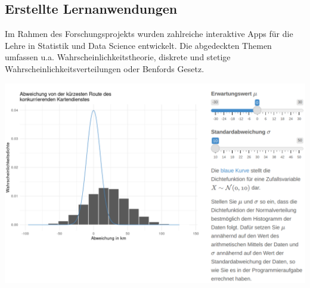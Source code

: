 \documentclass[a0,portrait]{a0poster}
\begin{document}
\begin{multicols}{2}


%
%

\section*{Erstellte Lernanwendungen}

Im Rahmen des Forschungsprojekts wurden zahlreiche interaktive Apps für die Lehre in Statistik und Data Science entwickelt. Die abgedeckten Themen umfassen u.a. Wahrscheinlichkeitstheorie, diskrete und stetige Wahrscheinlichkeitsverteilungen oder Benfords Gesetz.%

\begin{center}\vspace{1cm}
\includegraphics[width=0.6\linewidth]{wvstetig}
\end{center}


\end{multicols}
\end{document}
